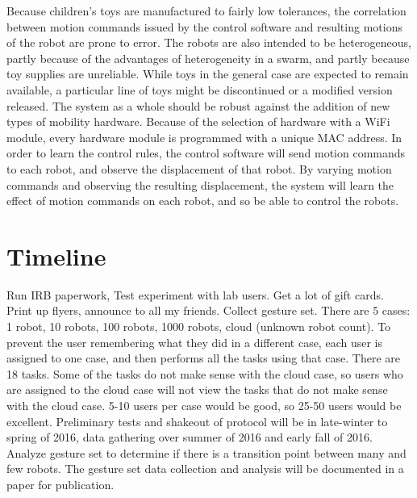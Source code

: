 \documentclass[]{article}
\begin{document}
Because children's toys are manufactured to fairly low tolerances, the correlation between motion commands issued by the control software and resulting motions of the robot are prone to error. 
The robots are also intended to be heterogeneous, partly because of the advantages of heterogeneity in a swarm, and partly because toy supplies are unreliable.
While toys in the general case are expected to remain available, a particular line of toys might be discontinued or a modified version released. 
The system as a whole should be robust against the addition of new types of mobility hardware. 
Because of the selection of hardware with a WiFi module, every hardware module is programmed with a unique MAC address. 
In order to learn the control rules, the control software will send motion commands to each robot, and observe the displacement of that robot. 
By varying motion commands and observing the resulting displacement, the system will learn the effect of motion commands on each robot, and so be able to control the robots. 

\section{Timeline}

Run IRB paperwork, Test experiment with lab users. Get a lot of gift cards. Print up flyers, announce to all my friends. Collect gesture set. There are 5 cases: 1 robot, 10 robots, 100 robots, 1000 robots, cloud (unknown robot count). To prevent the user remembering what they did in a different case, each user is assigned to one case, and then performs all the tasks using that case. There are 18 tasks. Some of the tasks do not make sense with the cloud case, so users who are assigned to the cloud case will not view the tasks that do not make sense with the cloud case. 5-10 users per case would be good, so 25-50 users would be excellent. Preliminary tests and shakeout of protocol will be in late-winter to spring of 2016, data gathering over summer of 2016 and early fall of 2016. Analyze gesture set to determine if there is a transition point between many and few robots. 
The gesture set data collection and analysis will be documented in a paper for publication. 
 
\end{document}
